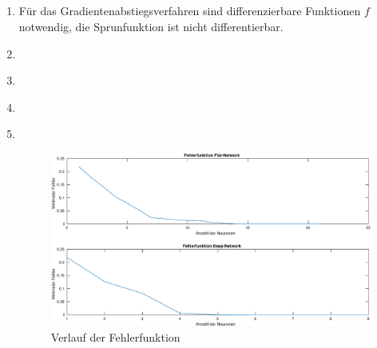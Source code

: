 \documentclass[DIN, pagenumber=false, fontsize=11pt, parskip=half]{scrartcl}
\begin{document}
    \subsection{}
    \begin{enumerate}[label=(\alph*)]
        \item Für das Gradientenabstiegsverfahren sind differenzierbare Funktionen $f$ notwendig, die Sprunfunktion ist nicht differentierbar.
        \item $ $ 
        \item $ $ 
        \item $ $ 
        \item $ $
            \begin{figure}[H]
                \centering
                \includegraphics[width=\textwidth]{b07a02.eps}
                \caption{Verlauf der Fehlerfunktion}
            \end{figure}
    \end{enumerate}
\end{document}
